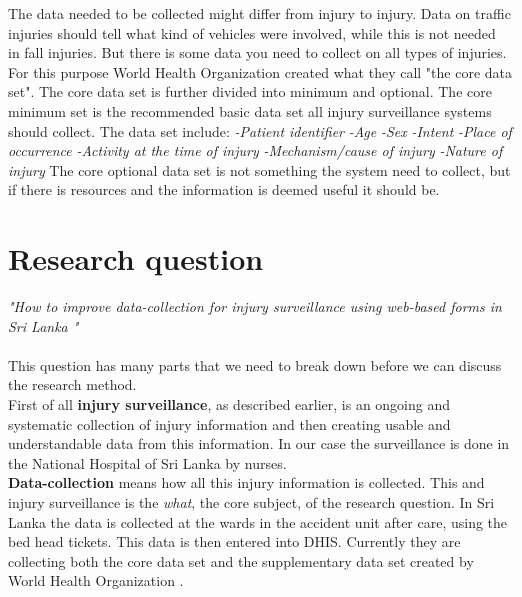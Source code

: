 \documentclass[UKenglish, 12pt]{article}
\newcommand{\WHO}{World Health Organization }
\newcommand{\RQ}{How to improve data-collection for injury surveillance
using web-based forms in Sri Lanka }
\newcommand{\is}{injury surveillance}
\begin{document}
The data needed to be collected might differ from injury to injury. Data on
traffic injuries should tell what kind of vehicles were involved, while this is
not needed in fall injuries. But there is some data you need to collect on all
types of injuries. For this purpose \WHO created what they call "the core data
set".\cite[25]{who-guide} The core data set is further divided into minimum and
optional. The core minimum set is the recommended basic data set all \is
systems should collect. The data set include:
\newline \emph{-Patient identifier}
\newline \emph{-Age}
\newline \emph{-Sex}
\newline \emph{-Intent}
\newline \emph{-Place of occurrence}
\newline \emph{-Activity at the time of injury}
\newline \emph{-Mechanism/cause of injury}
\newline \emph{-Nature of injury}
\newline The core optional data set is not something
the system need to collect, but if there is resources and the information is
deemed useful it should be. 


\newpage \section*{Research question} 
\textit{"\RQ"} \\\\ This question has
many parts that we need to break down before we can discuss the research
method.\\

First of all \textbf{\is}, as described earlier, is an ongoing and
systematic collection of injury information and then creating usable and
understandable data from this information. In our case the surveillance is done
in the National Hospital of Sri Lanka by nurses. \\

\textbf{Data-collection} means how all this injury information is
collected. This and injury surveillance is the \textit{what}, the core subject, of the
research question. In Sri Lanka the data is collected at the wards in the
accident unit after care, using the bed head tickets. This data is then entered
into DHIS. Currently they are collecting both the core data set and the
supplementary data set created by \WHO.\\
\end{document}
